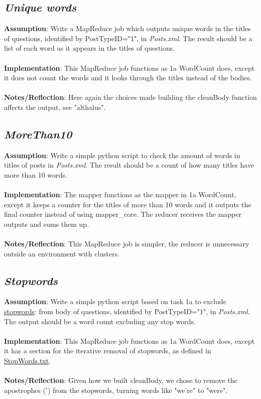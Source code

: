 \documentclass[fleqn,10pt]{wlscirep}
\begin{document}
\subsection{\emph{Unique words}}
\textbf{Assumption}: Write a MapReduce job which outputs unique words in the titles of questions, identified by PostTypeID="1", in \textit{Posts.xml}. The result should be a list of each word as it appears in the titles of questions. \\ \\
\textbf{Implementation}: This MapReduce job functions as 1a WordCount does, except it does not count the words and it looks through the titles instead of the bodies. \\ \\
\textbf{Notes/Reflection}: Here again the choices made building the cleanBody function affects the output, see "althalus".


\subsection{\emph{MoreThan10}}
\textbf{Assumption}: Write a simple python script to check the amount of words in titles of posts in \textit{Posts.xml}. The result should be a count of how many titles have more than 10 words. \\ \\
\textbf{Implementation}: The mapper functions as the mapper in 1a WordCount, except it keeps a counter for the titles of more than 10 words and it outputs the final counter instead of using mapper\_core.
The reducer receives the mapper outputs and sums them up. \\ \\
\textbf{Notes/Reflection}: This MapReduce job is simpler, the reducer is unnecessary outside an environment with clusters.


\subsection{\emph{Stopwords}}
\textbf{Assumption}: Write a simple python script based on task 1a to exclude \href{https://raw.githubusercontent.com/naimdjon/stopwords/master/stopwords.txt}{stopwords}: from body of questions, identified by PostTypeID="1", in \textit{Posts.xml}. The output should be a word count excluding any stop words. \\ \\
\textbf{Implementation}: This MapReduce job functions as 1a WordCount does, except it has a section for the iterative removal of stopwords, as defined in \href{https://raw.githubusercontent.com/naimdjon/stopwords/master/stopwords.txt}{StopWords.txt}. \\ \\
\textbf{Notes/Reflection}: Given how we built cleanBody, we chose to remove the apostrophes (') from the stopwords, turning words like "we're" to "were".

\end{document}
